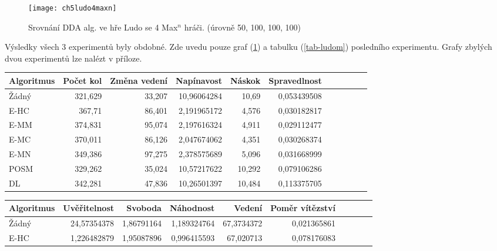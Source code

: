 \begin{figure}
  \centering
  \texttt{[image: ch5ludo4maxn]}
	\caption{Srovnání DDA alg. ve hře Ludo se 4 Max$^n$ hráči. (úrovně 50, 100, 100, 100)}
	\label{fig-ch5ludo4maxn}
\end{figure}

Výsledky všech 3 experimentů byly obdobné. Zde uvedu pouze graf (\ref{fig-ch5ludo4maxn}) a tabulku (\ref{tab-ludom}) posledního experimentu. Grafy zbylých dvou experimentů lze nalézt v příloze.

\begin{table*}[b]\footnotesize
\vspace*{0mm}
\caption{{\label{tab-ludom}} Porovnání metrik zábavnosti u jednotlivých algoritmů ve hře Ludo. Metriky změna vedení a svoboda se maximalizují, zbytek minimalizuje.}
\vspace*{0mm}
\label{shadowtable}
\begin{center}
\begin{tabular}{| l || r | r | r | r | r | r | r | r | r | r |}
\hline
Algoritmus & Počet kol	& Změna vedení & Napínavost & Náskok & Spravedlnost\\
\hline
\hline
Žádný & 321,629 & 33,207 & 10,96064284 & 10,69 & 0,053439508 \\ \hline  
E-HC & 367,71 & 86,401 & 2,191965172 & 4,576 & 0,030182817 \\ \hline  
E-MM & 374,831 & 95,074 & 2,197616324 & 4,911 & 0,029112477 \\ \hline  
E-MC & 370,011 & 86,126 & 2,047674062 & 4,351 & 0,030268374 \\ \hline  
E-MN & 349,386 & 97,275 & 2,378575689 & 5,096 & 0,031668999 \\ \hline  
POSM & 329,262 & 35,024 & 10,57217622 & 10,292 & 0,079106286 \\ \hline  
DL & 342,281 & 47,836 & 10,26501397 & 10,484 & 0,113375705 \\ \hline  
\end{tabular}
\end{center}
\begin{center}
\begin{tabular}{| l || r | r | r | r | r | r | r | r | r |}
\hline
Algoritmus & Uvěřitelnost & Svoboda & Náhodnost & Vedení &	Poměr vítězství \\
\hline
\hline
Žádný & 24,57354378 & 1,86791164 & 1,189324764 & 67,3734372 & 0,021365861 \\ \hline  
E-HC & 1,226482879 & 1,95087896 & 0,996415593 & 67,020713 & 0,078176083 \\ \hline  

\end{tabular}
\end{center}
\end{table*}
